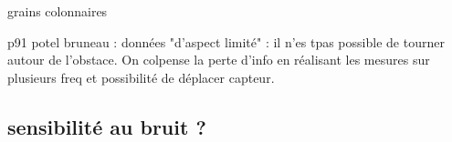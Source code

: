 
grains colonnaires

p91 potel bruneau : données "d'aspect limité" : il n'es tpas possible de tourner autour de l'obstace. On colpense la perte d'info en réalisant les mesures sur plusieurs freq et possibilité de déplacer capteur.




\subsection{sensibilité au bruit ?}

